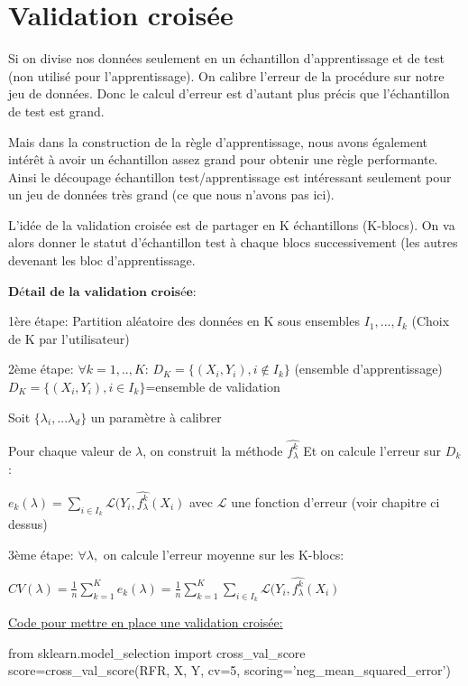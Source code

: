 \documentclass[a4paper,oneside,11pt]{article}
\begin{document}
\section*{Validation croisée}
%

\qquad Si on divise nos données seulement en un échantillon d'apprentissage et de test (non utilisé pour l'apprentissage). On calibre l'erreur de la procédure sur notre jeu de données. Donc le calcul d'erreur est d'autant plus précis que l'échantillon de test est grand.

Mais dans la construction de la règle d'apprentissage, nous avons également intérêt à avoir un échantillon assez grand  pour obtenir une règle performante.
Ainsi le découpage échantillon test/apprentissage est intéressant seulement pour un jeu de données très grand (ce que nous n'avons pas ici).

L'idée de la validation croisée est de partager en K échantillons (K-blocs). On va alors donner le statut d'échantillon test à chaque blocs  successivement (les autres devenant les bloc d'apprentissage.
 
$\textbf{Détail de la validation croisée:}$

1ère étape:
Partition aléatoire des données en K sous ensembles $I_1,...,I_k$ (Choix de K par l'utilisateur)

2ème étape:
$\forall k=1,..,K$:
$D_K=\{(X_i,Y_i), i\not\in I_k\}$ (ensemble d'apprentissage)
$D_K=\{(X_i,Y_i), i \in I_{k}\}$=ensemble de validation

Soit $\{\lambda_{i},...\lambda_{d}\}$ un paramètre à calibrer

Pour chaque valeur de $\lambda$, on construit la méthode
$\hat{f_\lambda^{k}}$
Et on calcule l'erreur sur $D_{k}$:

$e_{k}(\lambda)=\sum_{i\in I_{k}}\mathscr{L}(Y_i,\hat{f_{\lambda}^k}(X_i)$ avec $\mathscr{L}$ une fonction d'erreur (voir chapitre ci dessus)

3ème étape:
$\forall \lambda,$ on calcule l'erreur moyenne sur les K-blocs:

$CV(\lambda)=\frac{1}{n}\sum_{k=1}^{K}e_{k}(\lambda)=\frac{1}{n}\sum_{k=1}^{K}\sum_{i\in I_{k}}\mathscr{L}(Y_i,\hat{f_{\lambda}^k}(X_i)$



\underline{Code pour mettre en place une validation croisée:}
\begin{code-Python}
from sklearn.model_selection import cross_val_score
score=cross_val_score(RFR, X, Y, cv=5, scoring='neg_mean_squared_error')
\end{code-Python}
\end{document}

